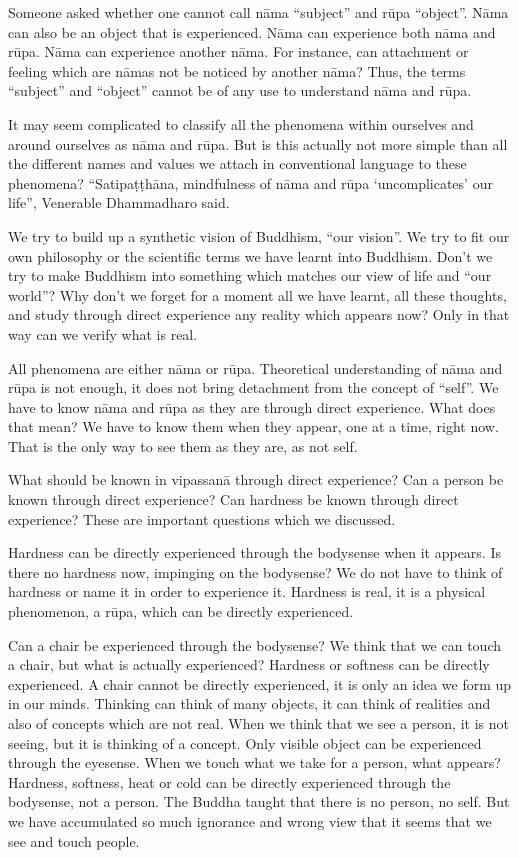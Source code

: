 Someone asked whether one cannot call nāma ``subject'' and rūpa
``object''. Nāma can also be an object that is experienced. Nāma can
experience both nāma and rūpa. Nāma can experience another nāma. For
instance, can attachment or feeling which are nāmas not be noticed by
another nāma? Thus, the terms ``subject'' and ``object'' cannot be of
any use to understand nāma and rūpa.

It may seem complicated to classify all the phenomena within ourselves
and around ourselves as nāma and rūpa. But is this actually not more
simple than all the different names and values we attach in conventional
language to these phenomena? ``Satipaṭṭhāna, mindfulness of nāma and
rūpa `uncomplicates' our life'', Venerable Dhammadharo said.

We try to build up a synthetic vision of Buddhism, ``our vision''. We
try to fit our own philosophy or the scientific terms we have learnt
into Buddhism. Don't we try to make Buddhism into something which
matches our view of life and ``our world''? Why don't we forget for a
moment all we have learnt, all these thoughts, and study through direct
experience any reality which appears now? Only in that way can we verify
what is real.

All phenomena are either nāma or rūpa. Theoretical understanding of nāma
and rūpa is not enough, it does not bring detachment from the concept of
``self''. We have to know nāma and rūpa as they are through direct
experience. What does that mean? We have to know them when they appear,
one at a time, right now. That is the only way to see them as they are,
as not self.

What should be known in vipassanā through direct experience? Can a
person be known through direct experience? Can hardness be known through
direct experience? These are important questions which we discussed.

Hardness can be directly experienced through the bodysense when it
appears. Is there no hardness now, impinging on the bodysense? We do not
have to think of hardness or name it in order to experience it. Hardness
is real, it is a physical phenomenon, a rūpa, which can be directly
experienced.

Can a chair be experienced through the bodysense? We think that we can
touch a chair, but what is actually experienced? Hardness or softness
can be directly experienced. A chair cannot be directly experienced, it
is only an idea we form up in our minds. Thinking can think of many
objects, it can think of realities and also of concepts which are not
real. When we think that we see a person, it is not seeing, but it is
thinking of a concept. Only visible object can be experienced through
the eyesense. When we touch what we take for a person, what appears?
Hardness, softness, heat or cold can be directly experienced through the
bodysense, not a person. The Buddha taught that there is no person, no
self. But we have accumulated so much ignorance and wrong view that it
seems that we see and touch people.

